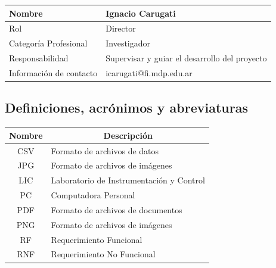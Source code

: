 \documentclass[titlepage, 12pt]{article}
\begin{document}
  \begin{table}[!hbtp]
    \centering
    \begin{tabularx}{\textwidth}{| >{\columncolor[HTML]{C0C0C0}}l |X|}
      \hline
      Nombre                  & Ignacio Carugati        \\ \hline
      Rol                     & Director                \\ \hline
      Categoría Profesional   & Investigador            \\ \hline
      Responsabilidad         & Supervisar y guiar el desarrollo del proyecto \\ \hline
      Información de contacto & icarugati@fi.mdp.edu.ar \\ \hline
    \end{tabularx}
  \end{table}

  \subsection{Definiciones, acrónimos y abreviaturas}
  \begin{table}[H]
    \centering
    \begin{tabular}{|c|l|}
    \hline
      \rowcolor[HTML]{C0C0C0}
      Nombre & \multicolumn{1}{c|}{\cellcolor[HTML]{C0C0C0}Descripción} \\ \hline
      CSV    & Formato de archivos de datos                             \\ \hline
      JPG    & Formato de archivos de imágenes                          \\ \hline
      LIC    & Laboratorio de Instrumentación y Control                 \\ \hline
      PC     & Computadora Personal                                     \\ \hline
      PDF    & Formato de archivos de documentos                        \\ \hline
      PNG    & Formato de archivos de imágenes                          \\ \hline
      RF     & Requerimiento Funcional                                  \\ \hline
      RNF    & Requerimiento No Funcional                               \\ \hline
    \end{tabular}
  \end{table}
\end{document}
